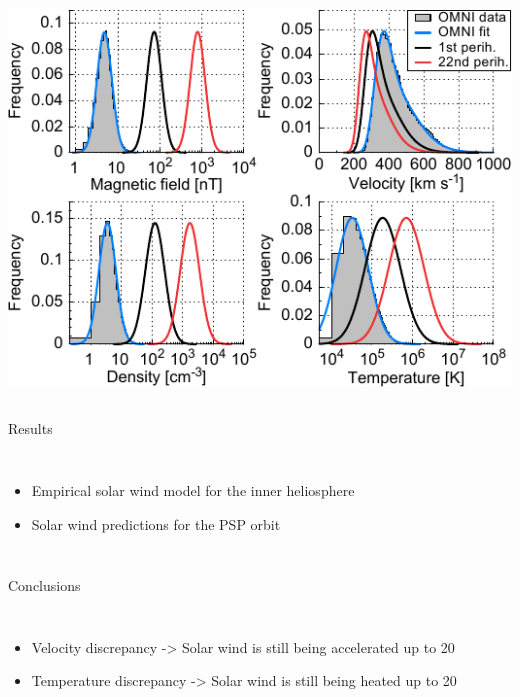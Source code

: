 \documentclass[11pt,aspectratio=1610]{beamer}	%
\newcommand{\captionoftiny}[2]{\captionof{#1}{\color{gray} \tiny #2}}
\begin{document}
\begin{frame}[c]{}{}
	\begin{columns}[c]
		
		\includegraphics[width=\textwidth]{../figures_paper/SPP_sw_distributions_b.pdf}


	\end{columns}
\end{frame}

\begin{frame}[c]{Results}{}
	\begin{columns}[c]
	\column{\textwidth}
		
		\begin{itemize}%
			\item Empirical solar wind model for the inner heliosphere
			\item Solar wind predictions for the PSP orbit
		\end{itemize}
		
	\end{columns}
\end{frame}
\begin{frame}[c]{Conclusions}{}
	\begin{columns}[c]
	\column{\textwidth}
		
		\begin{itemize}%
			\item Velocity discrepancy -> Solar wind is still being accelerated up to 20\,\Rs{}
			\item Temperature discrepancy -> Solar wind is still being heated up to 20\,\Rs{}
		\end{itemize}
		
	\end{columns}
\end{frame}
\end{document}
